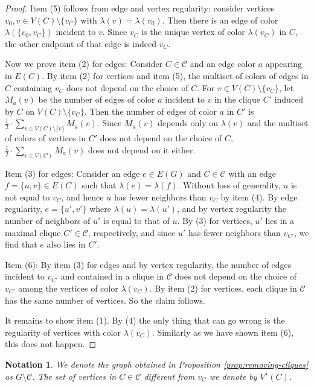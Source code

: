 \documentclass[a4paper, 11pt]{amsart}
\numberwithin{theorem}{section}
\newtheorem{notation}[theorem]{Notation}
\newcommand{\cC}{\mathcal{C}}
\begin{document}
\begin{proof}
    Item (5) follows from edge and vertex regularity: consider
    vertices $v_0,v\in V(C) \setminus \{v_C\}$ with $\lambda(v) =
    \lambda(v_0)$. Then there is an edge of color
    $\lambda(\{v_0,v_{C}\})$ incident to $v$. Since $v_C$ is the unique vertex of color $\lambda(v_{C})$ in $C$, the other endpoint of that edge is indeed $v_C$.

    Now we prove item (2) for edges: Consider $C\in \mathcal C$ and an
    edge color $a$ appearing in $E(C)$. By item (2) for vertices and
    item (5), the multiset of colors of edges in $C$ containing $v_C$
    does not depend on the choice of $C$. For $v\in V(C) \setminus
    \{v_C\}$, let $M_a(v)$ be the number of edges of color $a$
    incident to $v$ in the clique $C'$ induced by $C$ on $V(C) \setminus
    \{v_C\}$. Then the number of edges of color $a$ in $C'$ is $\frac
    1 2\cdot \sum_{v\in V(C) \setminus \{v\}} M_a(v)$. Since $M_a(v)$
    depends only on $\lambda (v)$ and the multiset of colors of
    vertices in $C'$ does not depend on the choice of $C$, $\frac 1 2\cdot \sum_{v\in V(C)} M_a(v)$ does not depend on it either.
    
    Item (3) for edges: Consider an edge $e\in E(G)$ and $C \in \cC$
    with an edge $f=\{u,v\} \in E(C)$ such that $\lambda (e) = \lambda
    (f)$. Without loss of generality, $u$ is not equal to $v_C$,
    and hence $u$ has fewer neighbors than $v_C$ by item (4). By
    edge regularity, $e=\{u',v'\}$ where $\lambda(u)=\lambda(u')$, and
    by vertex regularity the number of neighbors of $u'$
    is equal to that of $u$. By (3) for vertices, $u'$ lies 
    in a maximal clique $C' \in \cC$, respectively, and since $u'$
    has fewer neighbors than $v_{C'}$, we find that $e$ also lies in
    $C'$. 

    Item (6): By item (3) for edges and by vertex regularity, the number
    of edges incident to $v_{C'}$ and contained in a clique in $\mathcal C$ does not depend on the choice of $v_{C'}$ among
    the vertices of color $\lambda(v_C)$. By item (2) for vertices, each
    clique in $\cC$ has the same number of vertices. So the claim follows.

    It remains to show item (1). By (4) the only thing that can go wrong is the regularity of vertices with color $\lambda(v_C)$. Similarly as we have shown item (6), this does not happen.
\end{proof}

\begin{notation}
    We denote the graph obtained in Proposition \ref{prop:removing-cliques} as $G\setminus \mathcal{C}$. The set of vertices in $C\in\mathcal{C}$ different from $v_C$ we denote by $V^\star(C)$. 
\end{notation}
\end{document}
